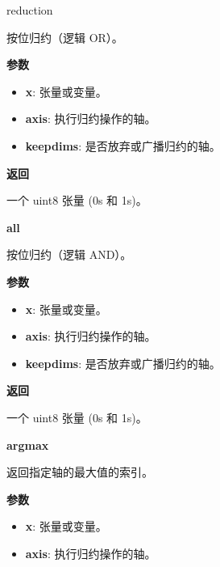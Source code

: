 reduction

按位归约（逻辑 OR）。

\textbf{参数}

\begin{itemize}
\tightlist
\item
  \textbf{x}: 张量或变量。
\item
  \textbf{axis}: 执行归约操作的轴。
\item
  \textbf{keepdims}: 是否放弃或广播归约的轴。
\end{itemize}

\textbf{返回}

一个 uint8 张量 (0s 和 1s)。


\textbf{all}\label{all}

\begin{Shaded}
\begin{Highlighting}[]
\OperatorTok{=}\OperatorTok{=}\NormalTok{)}
\end{Highlighting}
\end{Shaded}

按位归约（逻辑 AND）。

\textbf{参数}

\begin{itemize}
\tightlist
\item
  \textbf{x}: 张量或变量。
\item
  \textbf{axis}: 执行归约操作的轴。
\item
  \textbf{keepdims}: 是否放弃或广播归约的轴。
\end{itemize}

\textbf{返回}

一个 uint8 张量 (0s 和 1s)。


\textbf{argmax}\label{argmax}

\begin{Shaded}
\begin{Highlighting}[]
\OperatorTok{=-}\NormalTok{)}
\end{Highlighting}
\end{Shaded}

返回指定轴的最大值的索引。

\textbf{参数}

\begin{itemize}
\tightlist
\item
  \textbf{x}: 张量或变量。
\item
  \textbf{axis}: 执行归约操作的轴。
\end{itemize}


